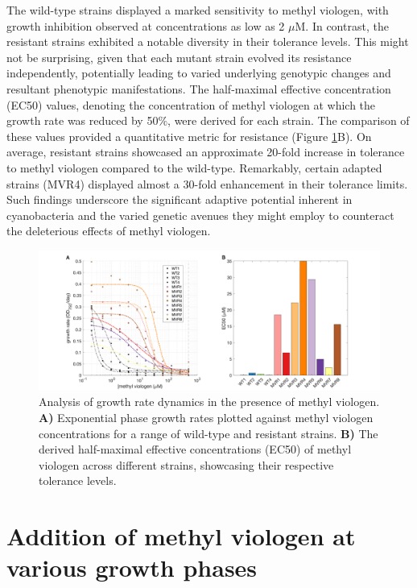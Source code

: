 \documentclass[12pt]{article}
\begin{document}
The wild-type strains displayed a marked sensitivity to methyl viologen, with growth inhibition observed at concentrations as low as 2 $\mu$M. In contrast, the resistant strains exhibited a notable diversity in their tolerance levels. This might not be surprising, given that each mutant strain evolved its resistance independently, potentially leading to varied underlying genotypic changes and resultant phenotypic manifestations. The half-maximal effective concentration (EC50) values, denoting the concentration of methyl viologen at which the growth rate was reduced by 50$\%$, were derived for each strain. The comparison of these values provided a quantitative metric for resistance (Figure \ref{fig:oxyelectrode}B).
On average, resistant strains showcased an approximate 20-fold increase in tolerance to methyl viologen compared to the wild-type. Remarkably, certain adapted strains (MVR4) displayed almost a 30-fold enhancement in their tolerance limits. Such findings underscore the significant adaptive potential inherent in cyanobacteria and the varied genetic avenues they might employ to counteract the deleterious effects of methyl viologen.

\begin{figure}[H]
    \centering
    \includegraphics[width=\hsize]{../Figures/MV_adaptation/EC50.pdf}
    \caption{Analysis of growth rate dynamics in the presence of methyl viologen. \textbf{A)} Exponential phase growth rates plotted against methyl viologen concentrations for a range of wild-type and resistant strains. \textbf{B)} The derived half-maximal effective concentrations (EC50) of methyl viologen across different strains, showcasing their respective tolerance levels.}
    \label{fig:oxyelectrode}
\end{figure}


\section{Addition of methyl viologen at various growth phases}
\end{document}
